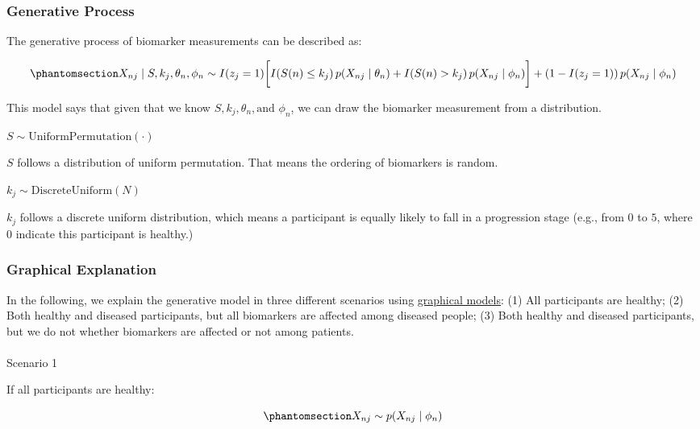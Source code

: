 \documentclass[
  letterpaper,
  DIV=11,
  numbers=noendperiod]{scrreprt}
\makeatletter
\let\oldparagraph\paragraph
\renewcommand{\paragraph}{
    \@ifstar
      \xxxParagraphStar
      \xxxParagraphNoStar
  }
\newcommand{\xxxParagraphStar}[1]{\oldparagraph*{#1}\mbox{}}
\newcommand{\xxxParagraphNoStar}[1]{\oldparagraph{#1}\mbox{}}
\makeatother
\begin{document}
\subsubsection{Generative Process}\label{generative-process}

The generative process of biomarker measurements can be described as:

\begin{equation}\phantomsection\label{eq-gen}{
X_{nj} \mid S, k_j, \theta_n, \phi_n \sim I(z_j = 1) \bigg[ I(S(n) \leq k_j) \, p(X_{nj} \mid \theta_{n}) + I(S(n) > k_j) \, p(X_{nj} \mid \phi_{n}) \bigg] \\
+ \left(1 - I(z_j = 1) \right) p(X_{nj} \mid \phi_{n})
}\end{equation}

This model says that given that we know
\(S, k_j, \theta_n, \text{and } \phi_n\), we can draw the biomarker
measurement from a distribution.

\(S \sim \mathrm{UniformPermutation}(\cdot)\)

\(S\) follows a distribution of uniform permutation. That means the
ordering of biomarkers is random.

\(k_j \sim \mathrm{DiscreteUniform}(N)\)

\(k_j\) follows a discrete uniform distribution, which means a
participant is equally likely to fall in a progression stage (e.g., from
\(0\) to \(5\), where \(0\) indicate this participant is healthy.)

\subsubsection{Graphical Explanation}\label{graphical-explanation}

In the following, we explain the generative model in three different
scenarios using
\href{https://en.wikipedia.org/wiki/Graphical_model}{graphical models}:
(1) All participants are healthy; (2) Both healthy and diseased
participants, but all biomarkers are affected among diseased people; (3)
Both healthy and diseased participants, but we do not whether biomarkers
are affected or not among patients.

\paragraph{Scenario 1}\label{scenario-1}

If all participants are healthy:

\begin{equation}\phantomsection\label{eq-gen-s1}{
X_{nj} \sim p(X_{nj} \mid \phi_{n})
}\end{equation}
\end{document}

